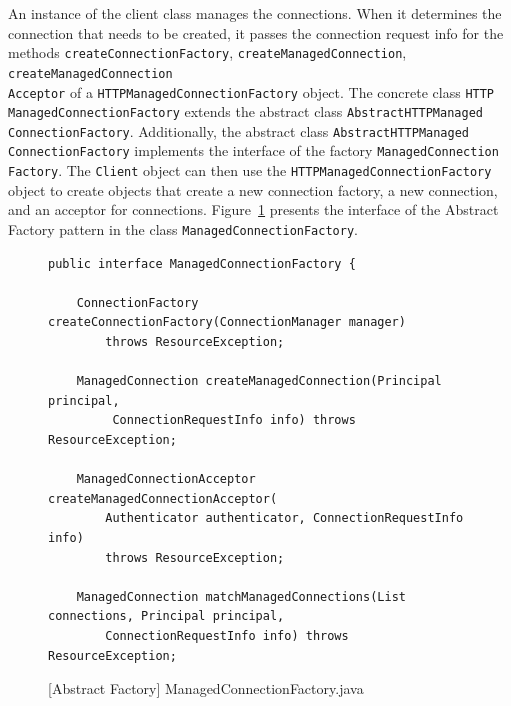 An instance of the client class manages the connections. When it determines the connection that needs to be created, it passes the connection request info for the methods \texttt{createConnectionFactory}, \texttt{createManagedConnection}, \texttt{createManagedConnection\\Acceptor} of a \texttt{HTTPManagedConnectionFactory} object. The concrete class \texttt{HTTP\\ManagedConnectionFactory} extends the abstract class \texttt{AbstractHTTPManaged\\ConnectionFactory}. Additionally, the abstract class \texttt{AbstractHTTPManaged\\ConnectionFactory} implements the interface of the factory \texttt{ManagedConnection\\Factory}. The \texttt{Client} object can then use the \texttt{HTTPManagedConnectionFactory} object to create objects that create a new connection factory, a new connection, and an acceptor for connections. Figure~\ref{fig:managedConnectionFactory} presents the interface of the Abstract Factory pattern in the class \texttt{ManagedConnectionFactory}.


\begin{figure}[htb]
\centering
\lstset{language=Java, basicstyle=\scriptsize, stepnumber=1, showspaces=false, showstringspaces=false,breaklines=true}
\begin{lstlisting}
public interface ManagedConnectionFactory {

    ConnectionFactory createConnectionFactory(ConnectionManager manager) 
        throws ResourceException;

    ManagedConnection createManagedConnection(Principal principal, 
         ConnectionRequestInfo info) throws ResourceException;

    ManagedConnectionAcceptor createManagedConnectionAcceptor(
        Authenticator authenticator, ConnectionRequestInfo info) 
        throws ResourceException;

    ManagedConnection matchManagedConnections(List connections, Principal principal,
        ConnectionRequestInfo info) throws ResourceException;

\end{lstlisting}
\caption{[Abstract Factory] ManagedConnectionFactory.java}
\label{fig:managedConnectionFactory}
\end{figure}
\FloatBarrier

